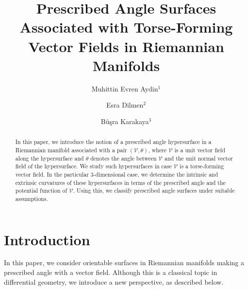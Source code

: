\documentclass[12pt,reqno]{amsart}
\theoremstyle{definition}
\begin{document}
\title[Prescribed angle surfaces]{Prescribed Angle Surfaces Associated with Torse-Forming Vector Fields in Riemannian Manifolds}


\author{Muhittin Evren Aydin$^1$}
\address{$^1$Department of Mathematics, Faculty of Science, Firat University, Elazığ,  23200 Türkiye
\newline
ORCID: 0000-0001-9337-8165}
\author{ Esra Dilmen$^2$}
 \address{$^2$Firat University, Graduate School of Natural and Applied Sciences, Mathematics,
Elazığ, Türkiye
\newline
ORCID: 0000-0001-6750-9475}

\author{ Büşra Karakaya$^3$}
 \address{$^3$Firat University, Graduate School of Natural and Applied Sciences, Mathematics,
Elazığ, Türkiye
 \newline
ORCID: 0009-0000-6285-3701}



\begin{abstract}
In this paper, we introduce the notion of a prescribed angle hypersurface in a Riemannian manifold associated with a pair $(\mathcal{V},\theta)$, where $\mathcal{V}$ is a unit vector field along the hypersurface and $\theta$ denotes the angle between $\mathcal{V}$ and the unit normal vector field of the hypersurface. We study such hypersurfaces in case $\mathcal{V}$ is a torse-forming vector field. In the particular $3$-dimensional case, we determine the intrinsic and extrinsic curvatures of these hypersurfaces in terms of the prescribed angle and the potential function of $\mathcal{V}$. Using this, we classify prescribed angle surfaces under suitable assumptions.
\end{abstract}
\maketitle

\section{Introduction} \label{intro}

In this paper, we consider orientable surfaces in Riemannian manifolds making a prescribed angle with a vector field. Although this is a classical topic in differential geometry, we introduce a new perspective, as described below.
\end{document}
